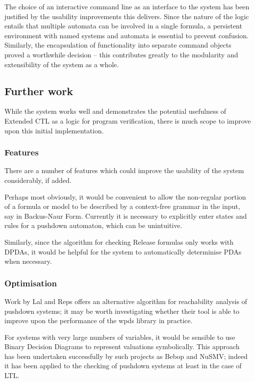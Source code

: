 \documentclass[11pt]{article}
\theoremstyle{definition}
\begin{document}
The choice of an interactive command line as an interface to the system has
been justified by the usability improvements this delivers. Since the nature of
the logic entails that multiple automata can be involved in a single formula, a
persistent environment with named systems and automata is essential to prevent
confusion. Similarly, the encapsulation of functionality into separate command
objects proved a worthwhile decision -- this contributes greatly to the
modularity and extensibility of the system as a whole.


\subsection{Further work}

While the system works well and demonstrates the potential usefulness of
Extended CTL as a logic for program verification, there is much scope to
improve upon this initial implementation. 

\subsubsection{Features}
There are a number of features which could improve the usability of the system
considerably, if added.

Perhaps most obviously, it would be convenient to allow the non-regular portion
of a formula or model to be described by a context-free grammar in the input,
say in Backus-Naur Form.  Currently it is necessary to explicitly enter states
and rules for a pushdown automaton, which can be unintuitive. 

Similarly, since the algorithm for checking Release formulas only works with
DPDAs, it would be helpful for the system to automatically determinise PDAs
when necessary.

\subsubsection{Optimisation}

Work by Lal and Reps\cite{lal2006improving} offers an alternative algorithm for
reachability analysis of pushdown systems; it may be worth investigating
whether their tool is able to improve upon the performance of the wpds library
in practice.

For systems with very large numbers of variables, it would be sensible to use
Binary Decision Diagrams to represent valuations symbolically. 
This approach has been undertaken successfully by such projects as
Bebop\cite{ball2000bebop} and NuSMV\cite{cimatti2002nusmv}; indeed it has been
applied to the checking of pushdown systems at least in the case of
LTL\cite{esparza2001bdd}.
\end{document}
